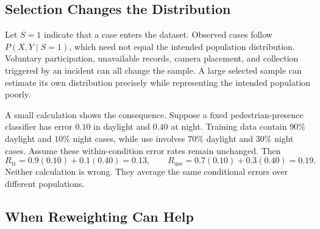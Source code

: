 \par\addvspace{\intextsep}\noindent\begin{minipage}{\linewidth}
\centering
{}
\label{fig:data-design-dimensions}
\end{minipage}\par\addvspace{\intextsep}

\subsection{Selection Changes the Distribution}

Let $S=1$ indicate that a case enters the dataset. Observed cases follow $P(X,Y\mid S=1)$, which need not equal the intended population distribution. Voluntary participation, unavailable records, camera placement, and collection triggered by an incident can all change the sample. A large selected sample can estimate its own distribution precisely while representing the intended population poorly.

A small calculation shows the consequence. Suppose a fixed pedestrian-presence classifier has error $0.10$ in daylight and $0.40$ at night. Training data contain $90\%$ daylight and $10\%$ night cases, while use involves $70\%$ daylight and $30\%$ night cases. Assume these within-condition error rates remain unchanged. Then
\[
R_{\mathrm{tr}}=0.9(0.10)+0.1(0.40)=0.13,
\qquad
R_{\mathrm{use}}=0.7(0.10)+0.3(0.40)=0.19.
\]
Neither calculation is wrong. They average the same conditional errors over different populations.

\subsection{When Reweighting Can Help}

